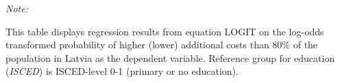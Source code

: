 \begin{table}[htbp!]
\begin{adjustbox}{width = 1\textwidth, max height = 0.95\textheight, center}
\begin{threeparttable}[b]
         \begin{tablenotes}\item \medskip \textit{Note:}
            \item This table displays regression results from equation LOGIT on the log-odds transformed probability of higher (lower) additional costs than 80\% of the population in Latvia as the dependent variable. Reference group for education (\textit{ISCED}) is ISCED-level 0-1 (primary or no education).
         \end{tablenotes}
      \end{threeparttable}
   \end{adjustbox}
\end{table}



